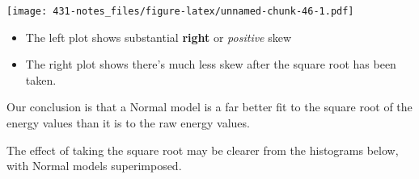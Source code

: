 \documentclass[
]{book}
\newenvironment{Shaded}{\begin{snugshade}}{\end{snugshade}}
\newcommand{\CommentTok}[1]{\textcolor[rgb]{0.56,0.35,0.01}{\textit{#1}}}
\newcommand{\ControlFlowTok}[1]{\textcolor[rgb]{0.13,0.29,0.53}{\textbf{#1}}}
\newcommand{\DataTypeTok}[1]{\textcolor[rgb]{0.13,0.29,0.53}{#1}}
\newcommand{\DecValTok}[1]{\textcolor[rgb]{0.00,0.00,0.81}{#1}}
\newcommand{\FloatTok}[1]{\textcolor[rgb]{0.00,0.00,0.81}{#1}}
\newcommand{\KeywordTok}[1]{\textcolor[rgb]{0.13,0.29,0.53}{\textbf{#1}}}
\newcommand{\NormalTok}[1]{#1}
\newcommand{\OperatorTok}[1]{\textcolor[rgb]{0.81,0.36,0.00}{\textbf{#1}}}
\newcommand{\StringTok}[1]{\textcolor[rgb]{0.31,0.60,0.02}{#1}}
\providecommand{\tightlist}{%
  \setlength{\itemsep}{0pt}\setlength{\parskip}{0pt}}
\begin{document}
\texttt{[image: 431-notes\_files/figure-latex/unnamed-chunk-46-1.pdf]}

\begin{itemize}
\tightlist
\item
  The left plot shows substantial \textbf{right} or \emph{positive} skew
\item
  The right plot shows there's much less skew after the square root has been taken.
\end{itemize}

Our conclusion is that a Normal model is a far better fit to the square root of the energy values than it is to the raw energy values.

The effect of taking the square root may be clearer from the histograms below, with Normal models superimposed.

\begin{Shaded}
\end{Shaded}
\end{document}
